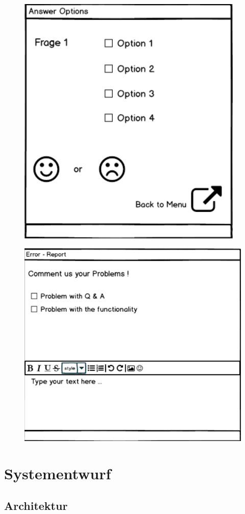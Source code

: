 \begin{figure}
	\centering
	\includegraphics[width=0.7\linewidth]{screenshot003}
	\caption{}
	\label{fig:screenshot003}
\end{figure}


\begin{figure}
	\centering
	\includegraphics[width=0.7\linewidth]{screenshot004}
	\caption{}
	\label{fig:screenshot004}
\end{figure}

\chapter{Systementwurf}

\section{Architektur}

